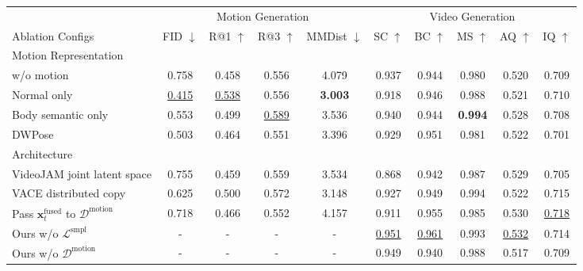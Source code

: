 \begin{table}[t!]
    \centering
    \scriptsize
    \setlength{\tabcolsep}{2pt}
    \begin{tabular}{lccccccccc}
        \toprule
        & \multicolumn{4}{c}{Motion Generation} & \multicolumn{5}{c}{Video Generation}\\
        \cmidrule(lr){2-5}\cmidrule(lr){6-10}
        Ablation Configs & FID $\downarrow$ & R@1 $\uparrow$ & R@3 $\uparrow$ & MMDist $\downarrow$ & SC $\uparrow$ & BC $\uparrow$ & MS $\uparrow$ & AQ $\uparrow$ & IQ $\uparrow$ \\
        \midrule
        \cellcolor{lightgray!30}Motion Representation & \cellcolor{lightgray!30} & \cellcolor{lightgray!30} & \cellcolor{lightgray!30} & \cellcolor{lightgray!30} & \cellcolor{lightgray!30} & \cellcolor{lightgray!30} & \cellcolor{lightgray!30} & \cellcolor{lightgray!30} & \cellcolor{lightgray!30} \\
        w/o motion & 0.758 & 0.458 & 0.556 & 4.079 & 0.937 & 0.944 & 0.980 & 0.520 & 0.709\\
        Normal only & \underline{0.415} & \underline{0.538} & 0.556 & \textbf{3.003} & 0.918 & 0.946 & 0.988 & 0.521 & 0.710\\
        Body semantic only & 0.553 & 0.499 & \underline{0.589} & 3.536 & 0.940 & 0.944 & \textbf{0.994} & 0.528 & 0.708\\
        DWPose & 0.503 & 0.464 & 0.551 & 3.396 & 0.929 & 0.951 & 0.981 & 0.522 & 0.701\\
        \midrule
        \cellcolor{lightgray!30}Architecture & \cellcolor{lightgray!30} & \cellcolor{lightgray!30} & \cellcolor{lightgray!30} & \cellcolor{lightgray!30} & \cellcolor{lightgray!30} & \cellcolor{lightgray!30} & \cellcolor{lightgray!30} & \cellcolor{lightgray!30} & \cellcolor{lightgray!30} \\
        VideoJAM joint latent space & 0.755 & 0.459 & 0.559 & 3.534 & 0.868 & 0.942 & 0.987 & 0.529 & 0.705\\
        VACE distributed copy & 0.625 & 0.500 & 0.572 & 3.148 & 0.927 & 0.949 & 0.994 & 0.522 & 0.715\\
        Pass $\bm{x}_t^{\text{fused}}$ to $\mathcal{D}^{\text{motion}}$ & 0.718 & 0.466 & 0.552 & 4.157 & 0.911 & 0.955 & 0.985 & 0.530 & \underline{0.718}\\
        Ours w/o $\mathcal{L}^{\text{smpl}}$ & - & - & - & - & \underline{0.951} & \underline{0.961} & 0.993 & \underline{0.532} & 0.714\\
        Ours w/o $\mathcal{D}^{\text{motion}}$ & - & - & - & - & 0.949 & 0.940 & 0.988 & 0.517 & 0.709\\

\end{tabular}
\end{table}
